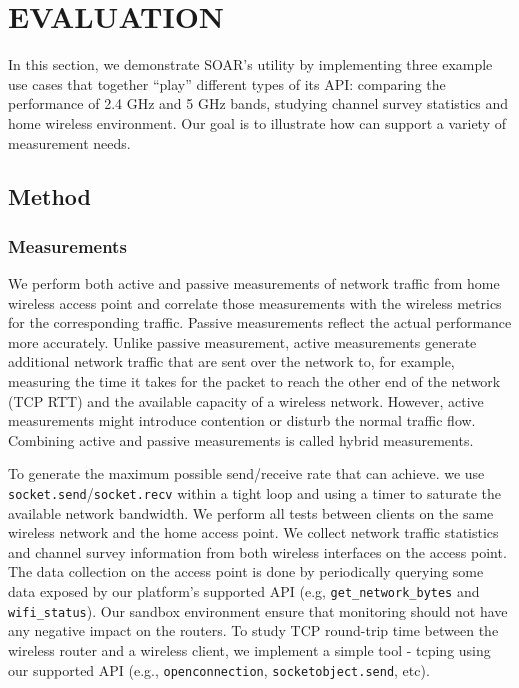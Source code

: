 \chapter{EVALUATION} 
\label{sec.evaluation}
In this section, we demonstrate SOAR's utility by implementing three example use cases that together ``play'' different types of its API: comparing the performance of 2.4 GHz and 5 GHz bands, studying channel survey statistics and home wireless environment. Our goal is to illustrate how \sysname can support a variety of measurement needs.
\section{Method}
\subsection{Measurements}
\label{ssec.measurements}

We perform both active and passive measurements of network traffic from home wireless access point and correlate those measurements with the wireless metrics for the corresponding traffic. Passive measurements reflect the actual performance more accurately. Unlike passive measurement, active measurements generate additional network traffic that are sent over the network to, for example, measuring the time it takes for the packet to reach the other end of the network (TCP RTT) and the available capacity of a wireless network. However, active measurements might introduce contention or disturb the normal traffic flow. Combining active and passive measurements is called hybrid measurements. 

To generate the maximum possible send/receive rate that \sysname can achieve. we use \texttt{socket.send}/\texttt{socket.recv} within a tight loop and using a timer to saturate the available network bandwidth. We perform all tests between clients on the same wireless network and the home access point. We collect network traffic statistics and channel survey information from both wireless interfaces on the access point. The data collection on the access point is done by periodically querying some data exposed by our platform's supported API (e.g, \texttt{get\_network\_bytes} and \texttt{wifi\_status}). Our sandbox environment ensure that monitoring should not have any negative impact on the routers. To study TCP round-trip time between the wireless router and a wireless client, we implement a simple tool - tcping using our supported API (e.g., \texttt{openconnection}, \texttt{socketobject.send}, etc). 
 
